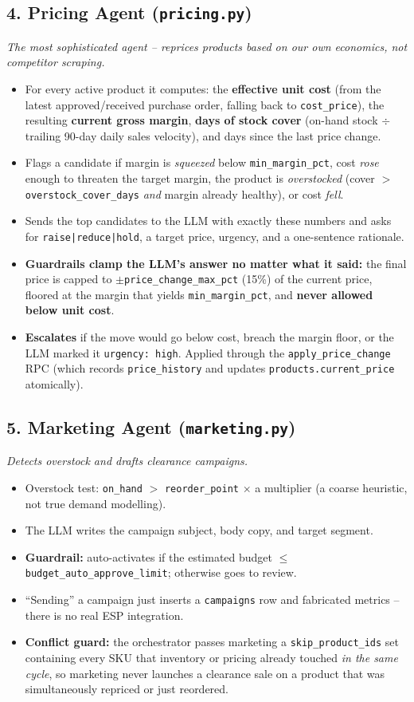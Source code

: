 \documentclass[11pt,a4paper]{article}
\newcommand{\agenthead}[2]{%
  \subsection*{\textcolor{accent}{#1}}%
  \textit{#2}\par\vspace{2pt}
}
\begin{document}
\agenthead{4. Pricing Agent (\texttt{pricing.py})}{The most sophisticated agent -- reprices
products based on our \emph{own} economics, not competitor scraping.}
\begin{itemize}[itemsep=1pt]
\item For every active product it computes: the \textbf{effective unit cost} (from the latest
approved/received purchase order, falling back to \texttt{cost\_price}), the resulting
\textbf{current gross margin}, \textbf{days of stock cover} (on-hand stock $\div$ trailing
90-day daily sales velocity), and days since the last price change.
\item Flags a candidate if margin is \emph{squeezed} below \texttt{min\_margin\_pct}, cost
\emph{rose} enough to threaten the target margin, the product is \emph{overstocked} (cover
$>$ \texttt{overstock\_cover\_days} \emph{and} margin already healthy), or cost \emph{fell}.
\item Sends the top candidates to the LLM with exactly these numbers and asks for
\texttt{raise|reduce|hold}, a target price, urgency, and a one-sentence rationale.
\item \textbf{Guardrails clamp the LLM's answer no matter what it said:} the final price is
capped to $\pm$\texttt{price\_change\_max\_pct} (15\%) of the current price, floored at the
margin that yields \texttt{min\_margin\_pct}, and \textbf{never allowed below unit cost}.
\item \textbf{Escalates} if the move would go below cost, breach the margin floor, or the LLM
marked it \texttt{urgency: high}. Applied through the \texttt{apply\_price\_change} RPC (which
records \texttt{price\_history} and updates \texttt{products.current\_price} atomically).
\end{itemize}

\agenthead{5. Marketing Agent (\texttt{marketing.py})}{Detects overstock and drafts clearance
campaigns.}
\begin{itemize}[itemsep=1pt]
\item Overstock test: \texttt{on\_hand} $>$ \texttt{reorder\_point} $\times$ a multiplier (a
coarse heuristic, not true demand modelling).
\item The LLM writes the campaign subject, body copy, and target segment.
\item \textbf{Guardrail:} auto-activates if the estimated budget $\le$
\texttt{budget\_auto\_approve\_limit}; otherwise goes to review.
\item ``Sending'' a campaign just inserts a \texttt{campaigns} row and fabricated metrics --
there is no real ESP integration.
\item \textbf{Conflict guard:} the orchestrator passes marketing a \texttt{skip\_product\_ids}
set containing every SKU that inventory or pricing already touched \emph{in the same cycle},
so marketing never launches a clearance sale on a product that was simultaneously repriced or
just reordered.
\end{itemize}
\end{document}
